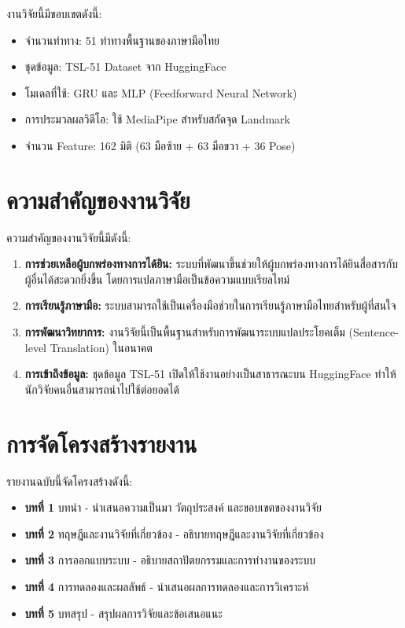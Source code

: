 \documentclass[12pt,a4paper]{report}
\begin{document}
งานวิจัยนี้มีขอบเขตดังนี้:

\begin{itemize}
    \item จำนวนท่าทาง: 51 ท่าทางพื้นฐานของภาษามือไทย
    \item ชุดข้อมูล: TSL-51 Dataset จาก HuggingFace
    \item โมเดลที่ใช้: GRU และ MLP (Feedforward Neural Network)
    \item การประมวลผลวิดีโอ: ใช้ MediaPipe สำหรับสกัดจุด Landmark
    \item จำนวน Feature: 162 มิติ (63 มือซ้าย + 63 มือขวา + 36 Pose)
\end{itemize}

\section{ความสำคัญของงานวิจัย}

ความสำคัญของงานวิจัยนี้มีดังนี้:

\begin{enumerate}
    \item \textbf{การช่วยเหลือผู้บกพร่องทางการได้ยิน:} ระบบที่พัฒนาขึ้นช่วยให้ผู้บกพร่องทางการได้ยินสื่อสารกับผู้อื่นได้สะดวกยิ่งขึ้น 
    โดยการแปลภาษามือเป็นข้อความแบบเรียลไทม์
    
    \item \textbf{การเรียนรู้ภาษามือ:} ระบบสามารถใช้เป็นเครื่องมือช่วยในการเรียนรู้ภาษามือไทยสำหรับผู้ที่สนใจ
    
    \item \textbf{การพัฒนาวิทยาการ:} งานวิจัยนี้เป็นพื้นฐานสำหรับการพัฒนาระบบแปลประโยคเต็ม (Sentence-level Translation) ในอนาคต
    
    \item \textbf{การเข้าถึงข้อมูล:} ชุดข้อมูล TSL-51 เปิดให้ใช้งานอย่างเป็นสาธารณะบน HuggingFace ทำให้นักวิจัยคนอื่นสามารถนำไปใช้ต่อยอดได้
\end{enumerate}

\section{การจัดโครงสร้างรายงาน}

รายงานฉบับนี้จัดโครงสร้างดังนี้:

\begin{itemize}
    \item \textbf{บทที่ 1} บทนำ - นำเสนอความเป็นมา วัตถุประสงค์ และขอบเขตของงานวิจัย
    \item \textbf{บทที่ 2} ทฤษฎีและงานวิจัยที่เกี่ยวข้อง - อธิบายทฤษฎีและงานวิจัยที่เกี่ยวข้อง
    \item \textbf{บทที่ 3} การออกแบบระบบ - อธิบายสถาปัตยกรรมและการทำงานของระบบ
    \item \textbf{บทที่ 4} การทดลองและผลลัพธ์ - นำเสนอผลการทดลองและการวิเคราะห์
    \item \textbf{บทที่ 5} บทสรุป - สรุปผลการวิจัยและข้อเสนอแนะ
\end{itemize}
\end{document}
